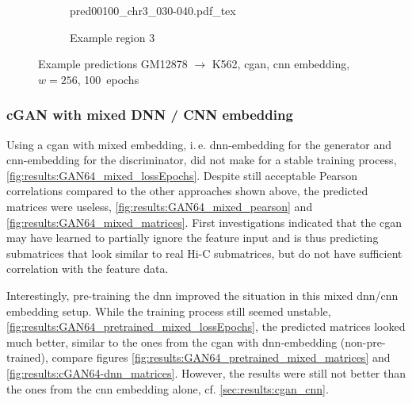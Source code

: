 \begin{figure}\ContinuedFloat
    \begin{subfigure}{\textwidth}
        \centering
        \scriptsize
        {pred00100_chr3_030-040.pdf_tex}
        \caption{Example region 3} \label{fig:results:cGAN256_r3}
    \end{subfigure}
    \caption{Example predictions GM12878 $\rightarrow$ K562, \acrshort{cgan}, \acrshort{cnn} embedding, $w=256$, 100~epochs} \label{fig:results:cGAN256_matrices}
\end{figure}

\subsubsection{cGAN with mixed DNN / CNN embedding} \label{sec:results:cgan-mixed}
Using a \acrshort{cgan} with mixed embedding, i.\,e. \acrshort{dnn}-embedding for the generator
and \acrshort{cnn}-embedding for the discriminator, did not make for a stable training process, \ref{fig:results:GAN64_mixed_lossEpochs}.
Despite still acceptable Pearson correlations compared to the other approaches shown above,
the predicted matrices were useless, \cref{fig:results:GAN64_mixed_pearson} and \ref{fig:results:GAN64_mixed_matrices}.
First investigations indicated that the \acrshort{cgan} may have learned to partially ignore the feature input 
and is thus predicting submatrices that look similar to real Hi-C submatrices, but do not have sufficient correlation with the feature data.

Interestingly, pre-training the \acrshort{dnn} improved the situation in this mixed \acrshort{dnn}/\acrshort{cnn} embedding setup. 
While the training process still seemed unstable, \cref{fig:results:GAN64_pretrained_mixed_lossEpochs},
the predicted matrices looked much better, similar to the ones from the \acrshort{cgan} with \acrshort{dnn}-embedding (non-pre-trained),
compare figures \ref{fig:results:GAN64_pretrained_mixed_matrices} and \ref{fig:results:cGAN64-dnn_matrices}.
However, the results were still not better than the ones from the \acrshort{cnn} embedding alone, cf. \cref{sec:results:cgan_cnn}.

